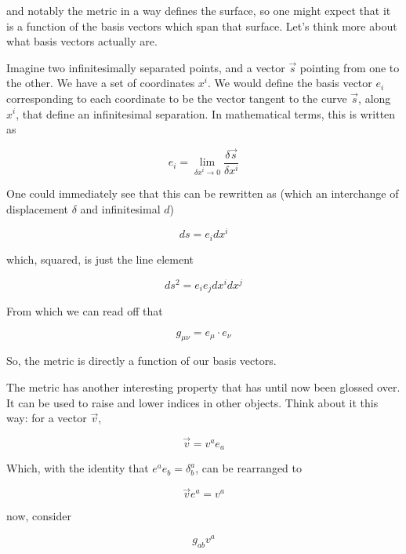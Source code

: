 \documentclass{article}
\begin{document}
and notably the metric in a way defines the surface, so one might expect that it is a function of the basis vectors which span that surface. Let's think more about what basis vectors actually are.

Imagine two infinitesimally separated points, and a vector $\vec{s}$ pointing from one to the other. We have a set of coordinates $x^i$. We would define the basis vector $e_i$ corresponding to each coordinate to be the vector tangent to the curve $\vec{s}$, along $x^i$, that define an infinitesimal separation. In mathematical terms, this is written as

\begin{equation}
    e_i = \lim_{\delta x^i \rightarrow 0} \frac{\delta \vec{s}}{\delta x^i}
\end{equation}

One could immediately see that this can be rewritten as (which an interchange of displacement $\delta$ and infinitesimal $d$)

\begin{equation}
    ds = e_i dx^i
\end{equation}

which, squared, is just the line element

\begin{equation}
    ds^2 = e_i e_j dx^i dx^j
\end{equation}

From which we can read off that

\begin{equation}
    g_{\mu\nu} = e_\mu \cdot e_\nu
\end{equation}

So, the metric is directly a function of our basis vectors. 

The metric has another interesting property that has until now been glossed over. It can be used to raise and lower indices in other objects. Think about it this way: for a vector $\vec{v}$,

\begin{equation}
    \vec{v} = v^ae_a
\end{equation}

Which, with the identity that $e^ae_b=\delta^a_b$, can be rearranged to

\begin{equation}
    \vec{v} e^a = v^a
\end{equation}

now, consider 

\begin{equation}
    g_{ab} v^a
\end{equation}
\end{document}
